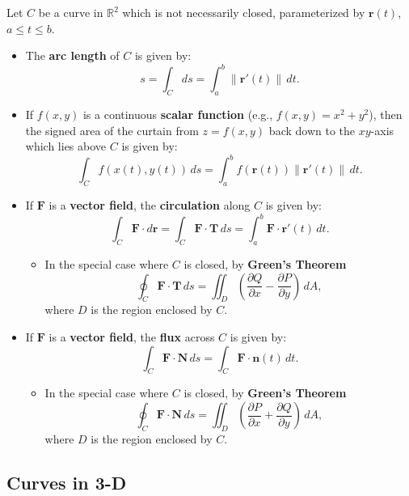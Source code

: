 \documentclass[10pt]{article}
\newcommand{\mb}[1]{\mathbf{#1}}
\newcommand{\vecfuc}[2]{\mb{#1}(#2)}
\newcommand{\dvecfuc}[2]{\mb{#1}'(#2)}
\newcommand{\normdvecfuc}[2]{\| \mb{#1}'(#2) \|}
\newcommand{\R}{\mathbb{R}}
\begin{document}
Let \(C\) be a curve in \(\R^{2}\) which is not necessarily closed, parameterized by \(\vecfuc{r}{t}\), \(a \leq t \leq b\).
\begin{itemize}
    \item The \textcolor{horange!80}{\textbf{arc length}} of \(C\) is given by: 
    \[
        s = \displaystyle\int_{C} ds = \int_{a}^{b} \normdvecfuc{r}{t} \, dt.
    \]
    \item If \(f(x,y)\) is a continuous \textcolor{horange!80}{\textbf{scalar function}} (e.g., \(f(x,y) = x^{2} + y^{2}\)), then the signed area of the curtain from \(z = f(x,y)\) back down to the \(xy\)-axis which lies above \(C\) is given by:
    \[
        \int_{C} f(x(t), y(t)) \, ds = \int_{a}^{b} f(\vecfuc{r}{t}) \normdvecfuc{r}{t} \, dt.
    \]
    \item If \(\mb{F}\) is a \textcolor{horange!80}{\textbf{vector field}}, the \textcolor{horange!80}{\textbf{circulation}} along \(C\) is given by:
    \[
        \int_{C} \mb{F} \cdot d\mb{r} = \int_{C} \mb{F} \cdot \mb{T} \, ds = \int_{a}^{b} \mb{F} \cdot \dvecfuc{r}{t} \, dt.
    \]
    \begin{itemize}
        \item In the special case where \(C\) is closed, by \textcolor{horange!80}{\textbf{Green’s Theorem}}
        \[
            \oint_{C} \mb{F} \cdot \mb{T} \, ds = \iint_{D} \left( \frac{\partial Q}{\partial x} - \frac{\partial P}{\partial y} \right)  \, dA,
        \]
        where \(D\) is the region enclosed by \(C\).
    \end{itemize}
    \item If \(\mb{F}\) is a \textcolor{horange!80}{\textbf{vector field}}, the \textcolor{horange!80}{\textbf{flux}} across \(C\) is given by:
    \[
        \int_{C} \mb{F} \cdot \mb{N} \, ds = \int_{C} \mb{F} \cdot \mb{n}(t) \, dt.
    \]
    \begin{itemize}
        \item In the special case where \(C\) is closed, by \textcolor{horange!80}{\textbf{Green’s Theorem}}
        \[
            \oint_{C} \mb{F} \cdot \mb{N} \, ds = \iint_{D} \left( \frac{\partial P}{\partial x} + \frac{\partial Q}{\partial y} \right)  \, dA, 
        \]
        where \(D\) is the region enclosed by \(C\).
    \end{itemize}
\end{itemize}

\subsection*{Curves in 3-D}
\end{document}
